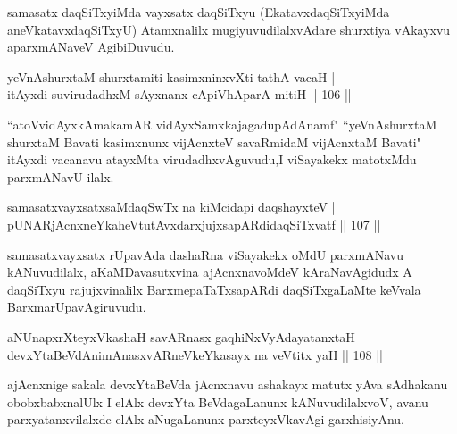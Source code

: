 \begin{artha}
samasatx daqSiTxyiMda vayxsatx daqSiTxyu (EkatavxdaqSiTxyiMda aneVkatavxdaqSiTxyU) Atamxnalilx mugiyuvudilalxvAdare shurxtiya vAkayxvu aparxmANaveV AgibiDuvudu.
\end{artha}

\begin{shl}
yeVnAshurxtaM shurxtamiti kasimxninxvXti tathA vacaH |\\
itAyxdi suvirudadhxM sAyxnanx cApiVhAparA mitiH \hfill || 106 ||
\end{shl}

\begin{artha}
``atoVvidAyxkAmakamAR vidAyxSamxkajagadupAdAnamf" ``yeVnAshurxtaM shurxtaM Bavati  kasimxnunx vijAcnxteV savaRmidaM vijAcnxtaM Bavati" itAyxdi vacanavu atayxMta virudadhxvAguvudu,I viSayakekx matotxMdu 
parxmANavU ilalx.
\end{artha}


\begin{shl}
samasatxvayxsatxsaMdaqSwTx na kiMcidapi daqshayxteV |\\
pUNARjAcnxneYkaheVtutAvxdarxjujxsapARdidaqSiTxvatf \hfill || 107 ||
\end{shl}

\begin{artha}
samasatxvayxsatx rUpavAda dashaRna viSayakekx oMdU parxmANavu kANuvudilalx, aKaMDavasutxvina ajAcnxnavoMdeV kAraNavAgidudx A daqSiTxyu rajujxvinalilx BarxmepaTaTxsapARdi daqSiTxgaLaMte keVvala BarxmarUpavAgiruvudu.
\end{artha}


\begin{shl}
aNUnapxrXteyxVkashaH savARnasx gaqhiNxVyAdayatanxtaH |\\
devxYtaBeVdAnimAnasxvARneVkeYkasayx na veVtitx yaH \hfill || 108 ||
\end{shl}

\begin{artha}
ajAcnxnige sakala devxYtaBeVda jAcnxnavu ashakayx matutx yAva sAdhakanu obobxbabxnalUlx I elAlx devxYta BeVdagaLanunx kANuvudilalxvoV, avanu parxyatanxvilalxde elAlx aNugaLanunx parxteyxVkavAgi garxhisiyAnu.
\end{artha}



